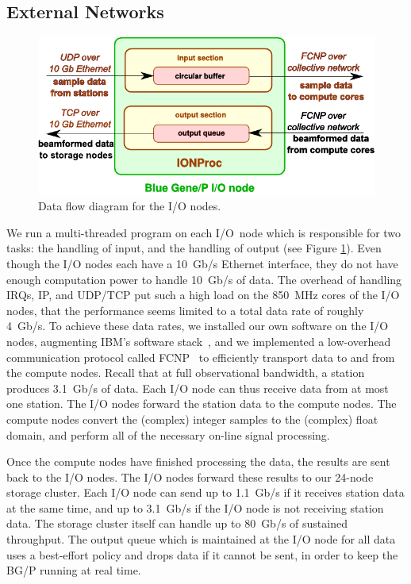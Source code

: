 \documentclass{llncs}
\begin{document}
\subsection{External Networks}
\label{Sec:Networks}

\begin{figure}[ht]
\includegraphics[width=\textwidth]{ION-processing.pdf}
\caption{Data flow diagram for the I/O nodes.}
\label{fig:ion-processing}
\end{figure}

We run a multi-threaded program on each I/O~node which is responsible for two tasks: the handling of input, and the handling of output (see Figure \ref{fig:ion-processing}). Even though the I/O nodes each have a 10~Gb/s Ethernet interface, they do not have enough computation power to handle 10~Gb/s of data. The overhead of handling IRQs, IP, and UDP/TCP put such a high load on the 850~MHz cores of the I/O nodes, that the performance seems limited to a total data rate of roughly 4~Gb/s. To achieve these data rates, we installed our own software on the I/O nodes, augmenting IBM's software stack~\cite{Yoshii:10}, and we implemented a low-overhead communication protocol called FCNP~\cite{Romein:09a} to efficiently transport data to and from the compute nodes. Recall that at full observational bandwidth, a station produces 3.1~Gb/s of data. Each I/O node can thus receive data from at most one station. The I/O nodes forward the station data to the compute nodes. The compute nodes convert the (complex) integer samples to the (complex) float domain, and perform all of the necessary on-line signal processing.

Once the compute nodes have finished processing the data, the results are sent back to the I/O nodes. The I/O nodes forward these results to our 24-node storage cluster. Each I/O node can send up to 1.1~Gb/s if it receives station data at the same time, and up to 3.1~Gb/s if the I/O node is not receiving station data. The storage cluster itself can handle up to 80~Gb/s of sustained throughput. The output queue which is maintained at the I/O node for all data uses a best-effort policy and drops data if it cannot be sent, in order to keep the BG/P running at real time.
\end{document}
